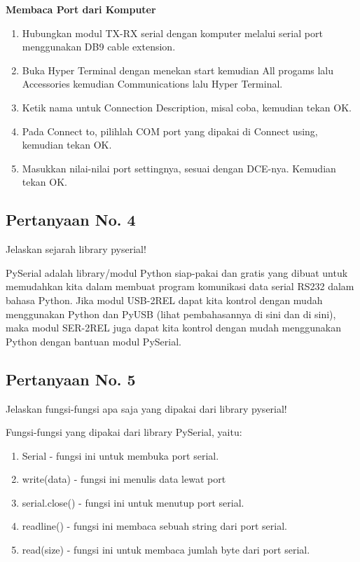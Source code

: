 \hfill \break
\textbf{Membaca Port dari Komputer}

\begin{enumerate}
	\item Hubungkan modul TX-RX serial dengan komputer melalui serial port menggunakan DB9 cable extension.
	\item Buka Hyper Terminal dengan menekan start kemudian All progams lalu Accessories kemudian Communications lalu Hyper Terminal.
	\item Ketik nama untuk Connection Description, misal coba, kemudian tekan OK.
	\item Pada Connect to, pilihlah COM port yang dipakai di Connect using, kemudian tekan OK.
	\item Masukkan nilai-nilai port settingnya, sesuai dengan DCE-nya. Kemudian tekan OK.
\end{enumerate}



\subsection{Pertanyaan No. 4}
Jelaskan sejarah library pyserial!

\hfill \break
PySerial adalah library/modul Python siap-pakai dan gratis yang dibuat untuk memudahkan kita dalam membuat program komunikasi data serial RS232 dalam bahasa Python.
Jika modul USB-2REL dapat kita kontrol dengan mudah menggunakan Python dan PyUSB (lihat pembahasannya di sini dan di sini), maka modul SER-2REL juga dapat kita kontrol dengan mudah menggunakan Python dengan bantuan modul PySerial.

\subsection{Pertanyaan No. 5}
Jelaskan fungsi-fungsi apa saja yang dipakai dari library pyserial!

\hfill \break
Fungsi-fungsi yang dipakai dari library PySerial, yaitu:
\begin{enumerate}
	\item Serial - fungsi ini untuk membuka port serial.
	\item write(data) - fungsi ini menulis data lewat port 
	\item serial.close() - fungsi ini untuk menutup port serial.
	\item readline() - fungsi ini membaca sebuah string dari port serial.
	\item read(size) - fungsi ini untuk membaca jumlah byte dari port serial.
\end{enumerate}

